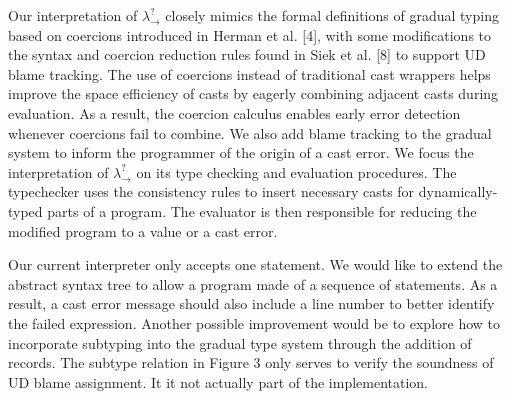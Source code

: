 Our interpretation of $\lambda ^? _{\rightarrow}$ closely 
mimics the formal definitions of gradual typing based on coercions introduced in 
Herman et al. [4], with some modifications to the syntax 
and coercion reduction rules found in Siek et al. [8] to 
support UD blame tracking. The use of coercions instead of 
traditional cast wrappers helps improve the space efficiency  
of casts by eagerly combining adjacent casts during 
evaluation. As a result, the coercion calculus enables 
early error detection whenever coercions fail to combine. 
We also add blame tracking to the gradual system  
to inform the programmer of the origin of a cast error. 
We focus the interpretation of $\lambda ^? _{\rightarrow}$ on its 
type checking and evaluation procedures. The typechecker 
uses the consistency rules to insert necessary casts for 
dynamically-typed parts of a program. The evaluator is then 
responsible for reducing the modified program to a value 
or a cast error. 

Our current interpreter only accepts one statement. We would 
like to extend the abstract syntax tree to allow a program made of 
a sequence of statements. As a result, a cast error message 
should also include a line number to better identify the 
failed expression. Another possible improvement would be to 
explore how to incorporate subtyping 
into the gradual type system through the addition of records. 
The subtype relation in Figure 3 only 
serves to verify the soundness of UD blame assignment. It 
it not actually part of the implementation. 
